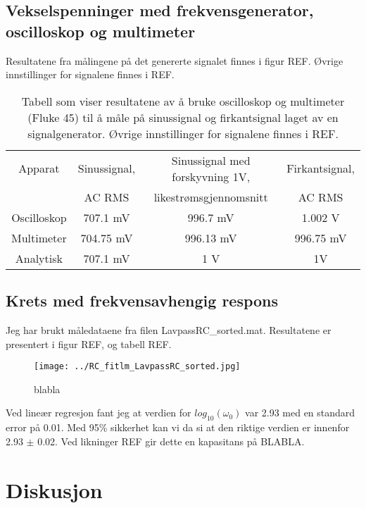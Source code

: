 \documentclass[reprint, english,notitlepage]{revtex4-1}  %
\begin{document}
\subsection{Vekselspenninger med frekvensgenerator, oscilloskop og multimeter}
Resultatene fra målingene på det genererte signalet finnes i figur REF. Øvrige innstillinger for signalene finnes i REF.
\begin{table}[p]
\label{fig:tabell_AC_RMS}
\caption{Tabell som viser resultatene av å bruke oscilloskop og multimeter (Fluke 45) til å måle på sinussignal og firkantsignal laget av en signalgenerator. Øvrige innstillinger for signalene finnes i REF.}

\begin{adjustbox}{width=\linewidth}
\begin{tabular}{||c | c | c | c||}
\hline
Apparat     & Sinussignal, & Sinussignal med forskyvning 1V, & Firkantsignal, \\
            & AC RMS      & likestrømsgjennomsnitt          & AC RMS        \\ \hline\hline
Oscilloskop & 707.1 mV    & 996.7 mV                        & 1.002 V       \\ \hline
Multimeter  & 704.75 mV   & 996.13 mV                       & 996.75 mV     \\ \hline
Analytisk   & 707.1 mV    & 1 V                             & 1V            \\ \hline
\end{tabular}
\end{adjustbox}
\end{table}

\subsection{Krets med frekvensavhengig respons}
Jeg har brukt måledataene fra filen LavpassRC\_sorted.mat. Resultatene er presentert i figur REF, og tabell REF.
\begin{figure}
  \texttt{[image: ../RC\_fitlm\_LavpassRC\_sorted.jpg]}
  \caption{blabla}
  \label{fig:LavpassRC}
\end{figure}
Ved lineær regresjon fant jeg at verdien for $log_{10}(\omega_0)$ var 2.93 med en standard error på 0.01. Med 95\% sikkerhet kan vi da si at den riktige verdien er innenfor 2.93 $\pm$ 0.02. Ved likninger REF gir dette en kapasitans på BLABLA.


\section{Diskusjon}
\end{document}
